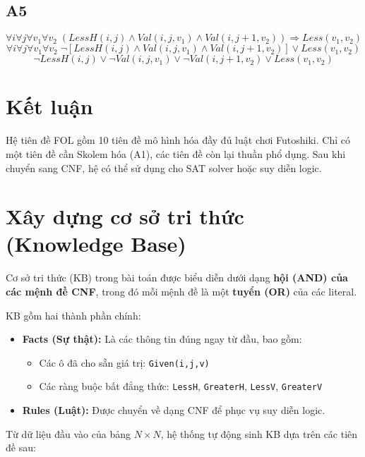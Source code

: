 \subsection{A5}
\[
\forall i \forall j \forall v_1 \forall v_2 \;
(LessH(i,j) \land Val(i,j,v_1) \land Val(i,j+1,v_2))
\Rightarrow Less(v_1,v_2)
\]
\[
\forall i \forall j \forall v_1 \forall v_2 \;
\neg [LessH(i,j) \land Val(i,j,v_1) \land Val(i,j+1,v_2)]
\lor Less(v_1,v_2)
\]
\[
\neg LessH(i,j) \lor \neg Val(i,j,v_1) \lor \neg Val(i,j+1,v_2) \lor Less(v_1,v_2)
\]

\section{Kết luận}

Hệ tiên đề FOL gồm 10 tiên đề mô hình hóa đầy đủ luật chơi Futoshiki. Chỉ có một tiên đề cần Skolem hóa (A1), các tiên đề còn lại thuần phổ dụng. Sau khi chuyển sang CNF, hệ có thể sử dụng cho SAT solver hoặc suy diễn logic.

\section{Xây dựng cơ sở tri thức (Knowledge Base)}

Cơ sở tri thức (KB) trong bài toán được biểu diễn dưới dạng \textbf{hội (AND) của các mệnh đề CNF}, trong đó mỗi mệnh đề là một \textbf{tuyển (OR)} của các literal.

KB gồm hai thành phần chính:

\begin{itemize}
    \item \textbf{Facts (Sự thật):} Là các thông tin đúng ngay từ đầu, bao gồm:
    \begin{itemize}
        \item Các ô đã cho sẵn giá trị: \texttt{Given(i,j,v)}
        \item Các ràng buộc bất đẳng thức: \texttt{LessH}, \texttt{GreaterH}, \texttt{LessV}, \texttt{GreaterV}
    \end{itemize}
    
    \item \textbf{Rules (Luật):} Được chuyển về dạng CNF để phục vụ suy diễn logic.
\end{itemize}

Từ dữ liệu đầu vào của bảng $N \times N$, hệ thống tự động sinh KB dựa trên các tiên đề sau:

